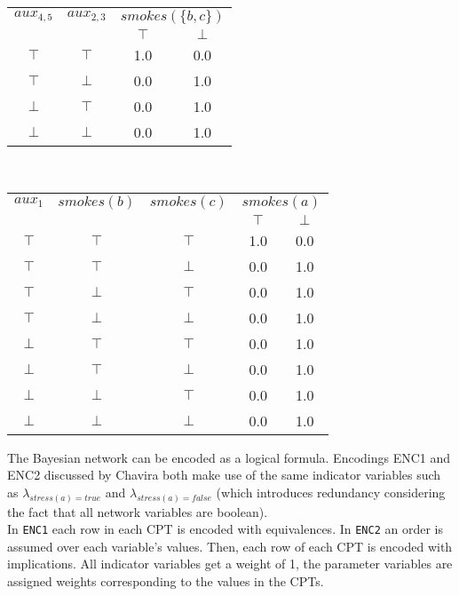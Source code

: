\begin{multicols*}{2}
\begin{center}
	\begin{tabular}{cc|cc}
		\underline{$aux_{4,5}$} & \underline{$aux_{2,3}$} & \multicolumn{2}{c}{\underline{$smokes(\{b,c\})$}} \\
		& & $\top$ & $\bot$ \\
		$\top$ & $\top$ & 1.0 & 0.0 \\
		$\top$ & $\bot$ & 0.0 & 1.0 \\
		$\bot$ & $\top$ & 0.0 & 1.0 \\
		$\bot$ & $\bot$ & 0.0 & 1.0 \\
	\end{tabular}
	\vspace{0.5cm}\\
	
	\begin{tabular}{ccc|cc}
		\underline{$aux_{1}$} & \underline{$smokes(b)$} & \underline{$smokes(c)$} & \multicolumn{2}{c}{\underline{$smokes(a)$}} \\
		& & & $\top$ & $\bot$ \\
		$\top$ & $\top$ & $\top$ & 1.0 & 0.0 \\
		$\top$ & $\top$ & $\bot$ & 0.0 & 1.0 \\
		$\top$ & $\bot$ & $\top$ & 0.0 & 1.0 \\
		$\top$ & $\bot$ & $\bot$ & 0.0 & 1.0 \\
		$\bot$ & $\top$ & $\top$ & 0.0 & 1.0 \\
		$\bot$ & $\top$ & $\bot$ & 0.0 & 1.0 \\
		$\bot$ & $\bot$ & $\top$ & 0.0 & 1.0 \\
		$\bot$ & $\bot$ & $\bot$ & 0.0 & 1.0 \\
	\end{tabular}

\end{center}



The Bayesian network can be encoded as a logical formula. Encodings ENC1 and ENC2 discussed by Chavira \cite{chavira} both make use of the same indicator variables such as $\lambda_{stress(a)=true}$ and $\lambda_{stress(a)=false}$ (which introduces redundancy considering the fact that all network variables are boolean). \\

\noindent In \texttt{ENC1} each row in each CPT is encoded with equivalences. In \texttt{ENC2} an order is assumed over each variable's values. Then, each row of each CPT is encoded with implications. All indicator variables get a weight of 1, the parameter variables are assigned weights corresponding to the values in the CPTs.\\


\end{multicols*}

